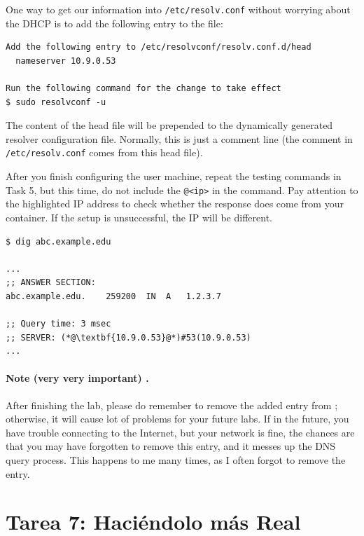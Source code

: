 One way to get our information into \texttt{/etc/resolv.conf} without worrying about
the DHCP is to add the following entry to the 
file:

\begin{lstlisting}
Add the following entry to /etc/resolvconf/resolv.conf.d/head
  nameserver 10.9.0.53

Run the following command for the change to take effect
$ sudo resolvconf -u
\end{lstlisting}

The content of the head file will be prepended to the dynamically generated resolver
configuration file. Normally, this is just a comment line (the comment in
\texttt{/etc/resolv.conf} comes from this head file).


After you finish configuring the user machine, repeat 
the testing commands in Task 5, but this time, do not 
include the \texttt{@<ip>} in the command. Pay attention to 
the highlighted IP address to check whether the response does 
come from your container. If the setup is unsuccessful,
the IP will be different.

\begin{lstlisting}
$ dig abc.example.edu

...
;; ANSWER SECTION:
abc.example.edu.	259200	IN	A	1.2.3.7

;; Query time: 3 msec
;; SERVER: (*@\textbf{10.9.0.53}@*)#53(10.9.0.53)
...
\end{lstlisting}
 

\paragraph{ Note (very very important) .} 
After finishing the lab, please do remember to remove the added entry
from ; otherwise, it will 
cause lot of problems for your future labs. If in the future,
you have trouble connecting to the Internet, but your network is fine, 
the chances are that you may have forgotten to remove this entry, and it 
messes up the DNS query process. This happens to me many times,
as I often forgot to remove the entry.


\section{Tarea 7: Haciéndolo más Real}


